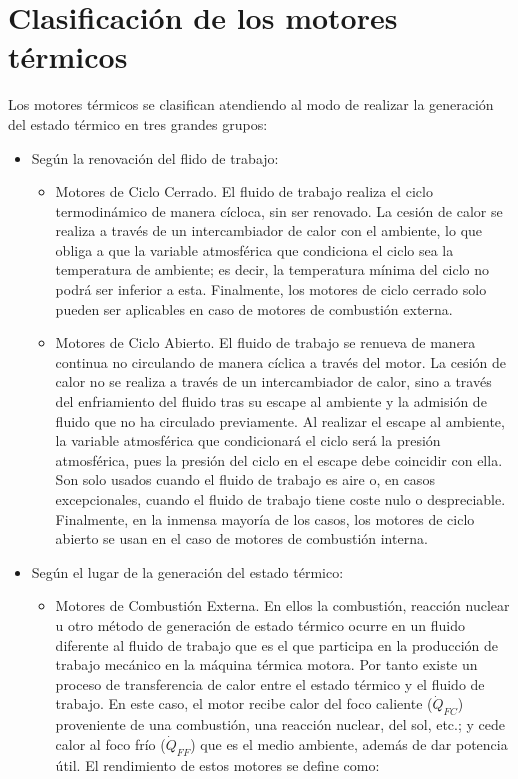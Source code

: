 \section{Clasificación de los motores térmicos}
Los motores térmicos se clasifican atendiendo al modo de realizar la generación del estado térmico en tres grandes grupos:
\begin{itemize}
    \item Según la renovación del flido de trabajo:
    \begin{itemize}
        \item Motores de Ciclo Cerrado. El fluido de trabajo realiza el ciclo termodinámico de manera cícloca, sin ser renovado. La cesión de calor se realiza a través de un intercambiador de calor con el ambiente, lo que obliga a que la variable atmosférica que condiciona el ciclo sea la temperatura de ambiente; es decir, la temperatura mínima del ciclo no podrá ser inferior a esta. Finalmente, los motores de ciclo cerrado solo pueden ser aplicables en caso de motores de combustión externa.
        \item Motores de Ciclo Abierto. El fluido de trabajo se renueva de manera continua no circulando de manera cíclica a través del motor. La cesión de calor no se realiza a través de un intercambiador de calor, sino a través del enfriamiento del fluido tras su escape al ambiente y la admisión de fluido que no ha circulado previamente. Al realizar el escape al ambiente, la variable atmosférica que condicionará el ciclo será la presión atmosférica, pues la presión del ciclo en el escape debe coincidir con ella. Son solo usados cuando el fluido de trabajo es aire o, en casos excepcionales, cuando el fluido de trabajo tiene coste nulo o despreciable. Finalmente, en la inmensa mayoría de los casos, los motores de ciclo abierto se usan en el caso de motores de combustión interna.
    \end{itemize}
    \item Según el lugar de la generación del estado térmico:
    \begin{itemize}
        \item Motores de Combustión Externa. En ellos la combustión, reacción nuclear u otro método de generación de estado térmico ocurre en un fluido diferente al fluido de trabajo que es el que participa en la producción de trabajo mecánico en la máquina térmica motora. Por tanto existe un proceso de transferencia de calor entre el estado térmico y el fluido de trabajo. En este caso, el motor recibe calor del foco caliente ($\dot{Q}_{FC}$) proveniente de una combustión, una reacción nuclear, del sol, etc.; y cede calor al foco frío ($\dot{Q}_{FF}$) que es el medio ambiente, además de dar potencia útil. El rendimiento de estos motores se define como:

\end{itemize}
\end{itemize}
